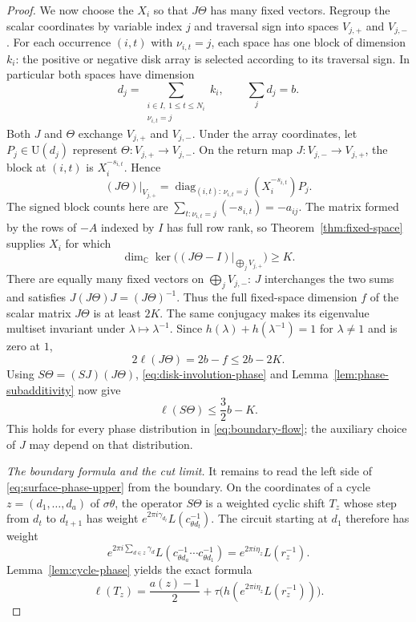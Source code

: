 \begin{proof}
We now choose the $X_i$ so that $J\Theta$ has many fixed vectors.  Regroup
the scalar coordinates by variable index $j$ and traversal sign into
spaces $V_{j,+}$ and $V_{j,-}$.  For each occurrence $(i,t)$ with
$\nu_{i,t}=j$, each space has one block of dimension $k_i$: the positive
or negative disk array is selected according to its traversal sign.
In particular both spaces have dimension
\[
 d_j=\sum_{\substack{i\in I,\ 1\leq t\leq N_i\\\nu_{i,t}=j}}k_i,
 \qquad \sum_j d_j=b.
\]
Both $J$ and $\Theta$ exchange $V_{j,+}$ and $V_{j,-}$.  Under the array
coordinates, let $P_j\in\mathrm U(d_j)$ represent
$\Theta:V_{j,+}\longrightarrow V_{j,-}$.  On the return map
$J:V_{j,-}\longrightarrow V_{j,+}$, the block at $(i,t)$ is
$X_i^{-s_{i,t}}$.  Hence
\begin{equation}\label{eq:fixed-space-application}
 (J\Theta)|_{V_{j,+}}
   =\operatorname{diag}_{(i,t):\,\nu_{i,t}=j}
           (X_i^{-s_{i,t}})P_j.
\end{equation}
The signed block counts here are
$\sum_{t:\nu_{i,t}=j}(-s_{i,t})=-a_{ij}$.  The matrix formed by the rows
of $-A$ indexed by $I$ has full row rank, so
Theorem~\ref{thm:fixed-space} supplies $X_i$ for which
\[
 \dim_{\mathbb C}\ker\bigl((J\Theta-I)|_{\bigoplus_j V_{j,+}}\bigr)
 \geq K.
\]
There are equally many fixed vectors on $\bigoplus_jV_{j,-}$: $J$
interchanges the two sums and satisfies
$J(J\Theta)J=(J\Theta)^{-1}$.  Thus the full fixed-space dimension
$f$ of the scalar matrix $J\Theta$ is at least $2K$.
The same conjugacy makes its eigenvalue multiset invariant under
$\lambda\mapsto\lambda^{-1}$.  Since
$h(\lambda)+h(\lambda^{-1})=1$ for $\lambda\ne1$ and is zero at $1$,
\[
 2\ell(J\Theta)=2b-f\leq2b-2K.
\]
Using $S\Theta=(SJ)(J\Theta)$, \eqref{eq:disk-involution-phase} and
Lemma~\ref{lem:phase-subadditivity} now give
\begin{equation}\label{eq:surface-phase-upper}
 \ell(S\Theta)\leq\frac32 b-K.
\end{equation}
This holds for every phase distribution in \eqref{eq:boundary-flow};
the auxiliary choice of $J$ may depend on that distribution.

\smallskip\noindent
\emph{The boundary formula and the cut limit.}
It remains to read the left side of \eqref{eq:surface-phase-upper} from
the boundary.  On the coordinates of a cycle
$z=(d_1,\ldots,d_a)$ of $\sigma\theta$, the operator $S\Theta$ is a
weighted cyclic shift $T_z$ whose step from $d_t$ to $d_{t+1}$ has weight
$e^{2\pi i\gamma_{d_t}}L(c_{\theta d_t}^{-1})$.  The circuit starting
at $d_1$ therefore has weight
\[
 e^{2\pi i\sum_{d\in z}\gamma_d}
 L(c_{\theta d_a}^{-1}\cdots c_{\theta d_1}^{-1})
   =e^{2\pi i\eta_z}L(r_z^{-1}).
\]
Lemma~\ref{lem:cycle-phase} yields the exact formula
\begin{equation}\label{eq:boundary-phase}
 \ell(T_z)=\frac{a(z)-1}{2}
       +\tau\bigl(h(e^{2\pi i\eta_z}L(r_z^{-1}))\bigr).
\end{equation}


\end{proof}
